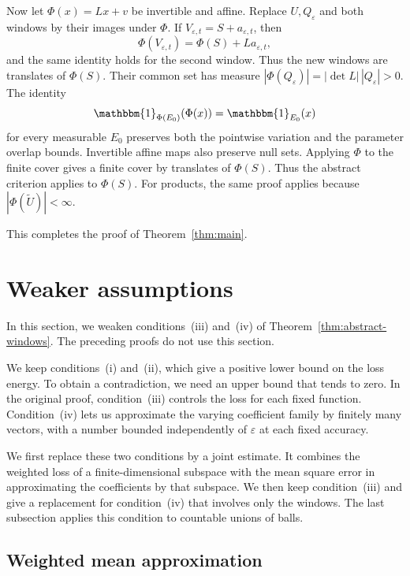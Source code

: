 \documentclass[12pt,reqno,tbtags]{amsart}
\newcommand\1{\mathbbm{1}}
\newcommand{\eps}{\varepsilon}
\begin{document}
Now let $\Phi(x)=Lx+v$ be invertible and affine. Replace $U,Q_\eps$ and both
windows by their images under $\Phi$. If $V_{\eps,t}=S+a_{\eps,t}$, then
\begin{equation*}
    \Phi(V_{\eps,t})=\Phi(S)+La_{\eps,t},
\end{equation*}
and the same identity holds for the second window.
Thus the new windows are translates of $\Phi(S)$.
Their common set has measure
$|\Phi(Q_\eps)|=|\det L|\,|Q_\eps|>0$.
The identity
\begin{equation*}
    \1_{\Phi(E_0)}(\Phi(x))=\1_{E_0}(x)
\end{equation*}
for every measurable $E_0$ preserves both the pointwise variation and the
parameter overlap bounds. Invertible affine maps also preserve null sets.
Applying $\Phi$ to the finite cover gives a finite cover by translates
of $\Phi(S)$. Thus the abstract criterion applies to $\Phi(S)$.
For products, the same proof applies because $|\Phi(\widetilde U)|<\infty$.

This completes the proof of Theorem~\ref{thm:main}.

\section{Weaker assumptions}\label{sec:weaker-assumptions}

In this section, we weaken conditions~(iii) and~(iv) of
Theorem~\ref{thm:abstract-windows}. The preceding proofs do not use this section.

We keep conditions~(i) and~(ii), which give a positive lower bound on the loss
energy. To obtain a contradiction, we need an upper bound that tends to zero.
In the original proof, condition~(iii) controls the loss for each fixed
function. Condition~(iv) lets us approximate the varying coefficient family
by finitely many vectors, with a number bounded independently of $\eps$
at each fixed accuracy.

We first replace these two conditions by a joint estimate. It combines
the weighted loss of a finite-dimensional subspace with the mean square
error in approximating the coefficients by that subspace.
We then keep condition~(iii) and give a replacement for condition~(iv)
that involves only the windows. The last subsection applies this condition
to countable unions of balls.

\subsection{Weighted mean approximation}
\end{document}

